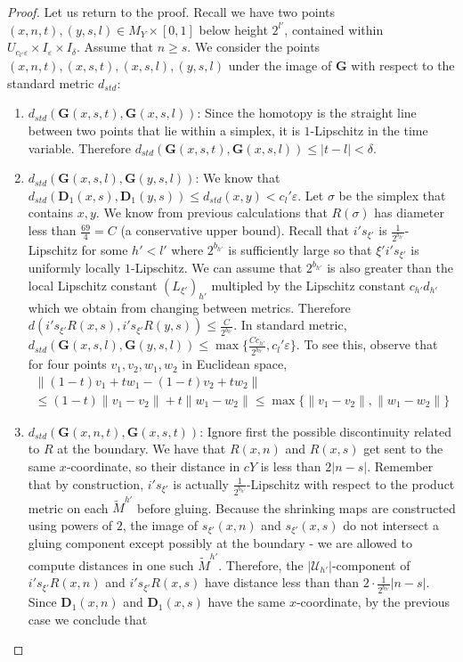 \documentclass[10pt,a4paper]{amsart}
\begin{document}
\begin{proof}
Let us return to the proof. Recall we have two points $(x,n,t),(y,s,l) \in M_{Y} \times [0,1]$ below height $2^{l'}$, contained within $U_{c_{l'}\varepsilon} \times I_{\varepsilon} \times I_{\delta}$. Assume that $n\geq s$. We consider the points $(x,n,t),(x,s,t),(x,s,l),(y,s,l)$ under the image of $\mathbf{G}$ with respect to the standard metric $d_{std}$:
\begin{enumerate}
\item $d_{std}(\mathbf{G}(x,s,t), \mathbf{G}(x,s,l))$: Since the homotopy is the straight line between two points that lie within a simplex, it is $1$-Lipschitz in the time variable. Therefore $d_{std}(\mathbf{G}(x,s,t), \mathbf{G}(x,s,l))\leq |t-l|<\delta$. 
\item $d_{std}(\mathbf{G}(x,s,l), \mathbf{G}(y,s,l))$: We know that $d_{std}(\mathbf{D}_{1}(x,s), \mathbf{D}_{1}(y,s))\leq d_{std}(x,y)< c_{l}'\varepsilon$. Let $\sigma$ be the simplex that contains $x,y$. We know from previous calculations that $R(\sigma)$ has diameter less than $\frac{69}{4} = C$ (a conservative upper bound). Recall that $i's_{\xi'}$ is $\frac{1}{2^{b_{h'}}}$-Lipschitz for some $h'<l'$ where $2^{b_{h'}}$ is sufficiently large so that $\xi' i's_{\xi'}$ is uniformly locally $1$-Lipschitz. We can assume that $2^{b_{h'}}$ is also greater than the local Lipschitz constant $(L_{\xi'})_{h'}$ multipled by the Lipschitz constant $c_{h'}d_{h'}$ which we obtain from changing between metrics. Therefore $d(i's_{\xi'}R(x,s), i's_{\xi'}R(y,s))\leq \frac{C}{2^{b_{h'}}}$. In standard metric, $d_{std}(\mathbf{G}(x,s,l), \mathbf{G}(y,s,l))\leq \max\{\frac{Cc_{h'}}{2^{b_{h'}}},c_{l}'\varepsilon\}$. To see this, observe that for four points $v_1,v_2,w_1,w_2$ in Euclidean space, 
\begin{align*}
\|(1-t)v_1+tw_1 - (1-t)v_2 + tw_2\| \\
\leq (1-t)\|v_1-v_2\| + t\|w_1-w_2\| \leq \max \{\|v_1-v_2\|, \|w_1-w_2\|\}
\end{align*}
\item $d_{std}(\mathbf{G}(x,n,t), \mathbf{G}(x,s,t))$:  Ignore first the possible discontinuity related to $R$ at the boundary. We have that $R(x,n)$ and $R(x,s)$ get sent to the same $x$-coordinate, so their distance in $cY$ is less than $2|n-s|$. Remember that by construction, $i' s_{\xi'}$ is actually $\frac{1}{2^{b_{h'}}}$-Lipschitz with respect to the product metric on each $\tilde{M}^{h'}$ before gluing.  Because the shrinking maps are constructed using powers of $2$, the image of $s_{\xi'}(x,n)$ and $s_{\xi'} (x,s)$ do not intersect a gluing component except possibly at the boundary - we are allowed to compute distances in one such $\tilde{M}^{h'}$. Therefore, the $|\mathcal{U}_{h'}|$-component of $i's_{\xi'}R(x,n)$ and $i's_{\xi'} R(x,s)$ have distance less than than $2\cdot \frac{1}{2^{b_{h'}}} |n-s|$. Since $\mathbf{D}_1(x,n)$ and $\mathbf{D}_{1}(x,s)$ have the same $x$-coordinate, by the previous case we conclude that 

\end{enumerate}
\end{proof}
\end{document}
